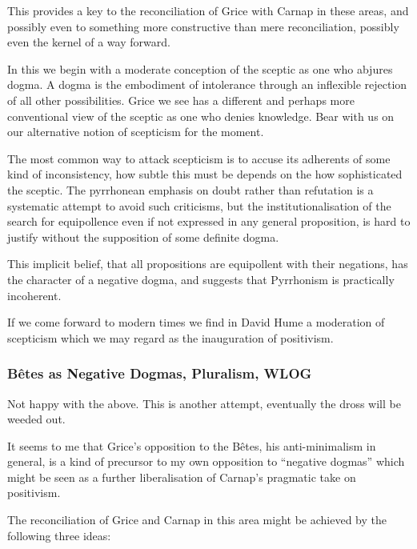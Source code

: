 \documentclass[10pt,titlepage]{book}
\begin{document}
This provides a key to the reconciliation of Grice with Carnap in these areas, and possibly even to something more constructive than mere reconciliation, possibly even the kernel of a way forward.

In this we begin with a moderate conception of the sceptic as one who abjures dogma.
A dogma is the embodiment of intolerance through an inflexible rejection of all other possibilities.
Grice we see has a different and perhaps more conventional view of the sceptic as one who denies knowledge.
Bear with us on our alternative notion of scepticism for the moment.

The most common way to attack scepticism is to accuse its adherents of some kind of inconsistency, how subtle this must be depends on the how sophisticated the sceptic.
The pyrrhonean emphasis on doubt rather than refutation is a systematic attempt to avoid such criticisms, but the institutionalisation of the search for equipollence even if not expressed in any general proposition, is hard to justify without the supposition of some definite dogma.

This implicit belief, that all propositions are equipollent with their negations, has the character of a negative dogma, and suggests that Pyrrhonism is practically incoherent.

If we come forward to modern times we find in David Hume a moderation of scepticism which we may regard as the inauguration of positivism.

\subsubsection{B\^etes as Negative Dogmas, Pluralism, WLOG}

Not happy with the above.
This is another attempt, eventually the dross will be weeded out.

It seems to me that Grice's opposition to the B\^etes, his anti-minimalism in general, is a kind of precursor to my own opposition to ``negative dogmas'' which might be seen as a further liberalisation of Carnap's pragmatic take on positivism.

The reconciliation of Grice and Carnap in this area might be achieved by the following three ideas:
\end{document}
